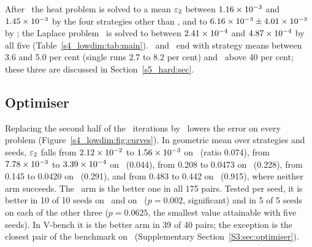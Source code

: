 After \AdamLBFGS\ the heat problem is solved to a mean $\varepsilon_{2}$ between $1.16\times 10^{-3}$
and $1.45\times 10^{-3}$ by the four strategies other than , and to
$6.16\times 10^{-3}\pm4.01\times 10^{-3}$ by ; the Laplace problem \PLtwo\ is solved
to between $2.41\times 10^{-4}$ and $4.87\times 10^{-4}$ by all five
(Table~\ref{s4_lowdim:tab:main}).
\PWtwo\ and \PLthree\ end with strategy means between 3.6 and 5.0 per cent (single runs
2.7 to 8.2 per cent) and \PWone\ above 40 per cent; these three are discussed in
Section~\ref{s5_hard:sec}.

\subsection{Optimiser}\label{s4_lowdim:sec:optimiser}

Replacing the second half of the \Adam\ iterations by \LBFGS\ lowers the error on every
problem (Figure~\ref{s4_lowdim:fig:curves}).
In geometric mean over strategies and seeds, $\varepsilon_{2}$ falls from $2.12\times 10^{-2}$ to
$1.56\times 10^{-3}$ on \PH\ (ratio 0.074), from $7.78\times 10^{-3}$ to $3.39\times 10^{-4}$ on
\PLtwo\ (0.044), from 0.208 to 0.0473 on \PWtwo\ (0.228), from 0.145 to 0.0420 on
\PLthree\ (0.291), and from 0.483 to 0.442 on \PWone\ (0.915), where neither arm succeeds.
The \AdamLBFGS\ arm is the better one in all 175 pairs.
Tested per seed, it is better in 10 of 10 seeds on \PH\ and on \PLtwo\ ($p=0.002$,
significant) and in 5 of 5 seeds on each of the other three ($p=0.0625$, the smallest value
attainable with five seeds).
In \textsf{V-bench} it is the better arm in 39 of 40 pairs; the exception is the closest
pair of the benchmark on \PH\ (Supplementary Section~\ref{S3:sec:optimiser}).

